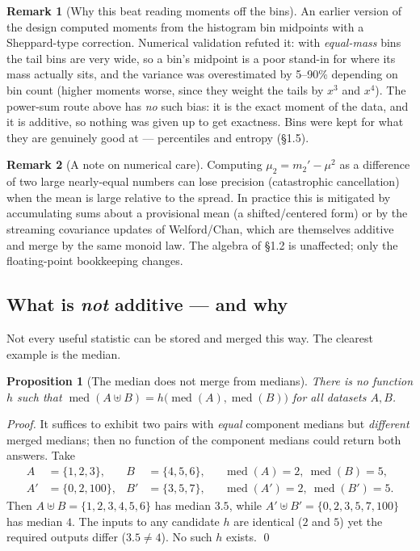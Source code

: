 \documentclass[11pt]{article}
\newtheorem{proposition}{Proposition}
\theoremstyle{definition}
\newtheorem{remark}{Remark}
\begin{document}
\begin{remark}[Why this beat reading moments off the bins]
An earlier version of the design computed moments from the histogram bin midpoints with a
Sheppard-type correction. Numerical validation refuted it: with \emph{equal-mass} bins the tail
bins are very wide, so a bin's midpoint is a poor stand-in for where its mass actually sits, and the
variance was overestimated by 5--90\% depending on bin count (higher moments worse, since they
weight the tails by $x^3$ and $x^4$). The power-sum route above has \emph{no} such bias: it is the
exact moment of the data, and it is additive, so nothing was given up to get exactness. Bins were
kept for what they are genuinely good at --- percentiles and entropy (\S1.5).
\end{remark}

\begin{remark}[A note on numerical care]
Computing $\mu_2 = m_2' - \mu^2$ as a difference of two large nearly-equal numbers can lose
precision (catastrophic cancellation) when the mean is large relative to the spread. In practice
this is mitigated by accumulating sums about a provisional mean (a shifted/centered form) or by
the streaming covariance updates of Welford/Chan, which are themselves additive and merge by the
same monoid law. The algebra of \S1.2 is unaffected; only the floating-point bookkeeping changes.
\end{remark}

\subsection{What is \emph{not} additive --- and why}

Not every useful statistic can be stored and merged this way. The clearest example is the median.

\begin{proposition}[The median does not merge from medians]\label{prop:median}
There is no function $h$ such that $\operatorname{med}(A \uplus B) = h\bigl(\operatorname{med}(A),
\operatorname{med}(B)\bigr)$ for all datasets $A, B$.
\end{proposition}

\begin{proof}
It suffices to exhibit two pairs with \emph{equal} component medians but \emph{different} merged
medians; then no function of the component medians could return both answers. Take
\begin{align*}
  A  &= \{1, 2, 3\}, & B  &= \{4, 5, 6\}, & &\operatorname{med}(A)=2,\ \operatorname{med}(B)=5, \\
  A' &= \{0, 2, 100\}, & B' &= \{3, 5, 7\}, & &\operatorname{med}(A')=2,\ \operatorname{med}(B')=5.
\end{align*}
Then $A \uplus B = \{1,2,3,4,5,6\}$ has median $3.5$, while $A' \uplus B' = \{0,2,3,5,7,100\}$ has
median $4$. The inputs to any candidate $h$ are identical ($2$ and $5$) yet the required outputs
differ ($3.5 \neq 4$). No such $h$ exists. \qed
\end{proof}
\end{document}
